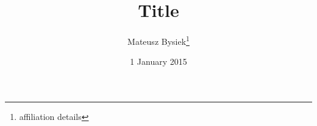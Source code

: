 \documentclass[a4paper
  ]{article}
\newcommand{\documentTitle}{Title}
\newcommand{\documentDate}{1 January 2015} %
\newcommand{\documentAuthor}{Mateusz Bysiek}
\begin{document}
\title{\documentTitle}
\author{\documentAuthor\footnote{affiliation details}}
\date{\documentDate}

\maketitle{}

\vfill{}

\tableofcontents{}

\vfill{}

\pagestyle{fancytext}
\thispagestyle{fancytext}

\newpage{}

\printbibliography
\end{document}
